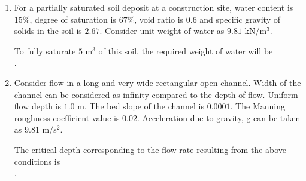 \documentclass[journal,12pt,onecolumn]{article}
\theoremstyle{remark}
\begin{document}
\begin{enumerate}
    \hfill{}
    \begin{enumerate}
    \end{enumerate}

    \item For a partially saturated soil deposit at a construction site, water content  is $15$\%, degree of saturation  is $67$\%, void ratio  is $0.6$ and specific gravity of solids in the soil  is $2.67$. Consider unit weight of water as $9.81$ kN/m$^3$.
    
    To fully saturate $5$ m$^3$ of this soil, the required weight of water  will be \underline{\hspace{2cm}} \\ .
    
    \hfill{}
    \begin{enumerate}
    \end{enumerate}

    \item Consider flow in a long and very wide rectangular open channel. Width of the channel can be considered as infinity compared to the depth of flow. Uniform flow depth is $1.0$ m. The bed slope of the channel is $0.0001$. The Manning roughness coefficient value is $0.02$. Acceleration due to gravity, g can be taken as $9.81$ m/s$^2$.
    
    The critical depth  corresponding to the flow rate resulting from the above conditions is \underline{\hspace{2cm}} \\ .
    
    \hfill{}
    \begin{enumerate}
    \end{enumerate}


\end{enumerate}
\end{document}
